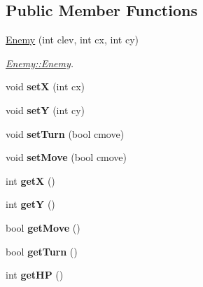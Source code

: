 \subsection*{Public Member Functions}
\begin{DoxyCompactItemize}
\item 
\hyperlink{class_enemy_a0638b6e9f11a72831051438dbf803d91}{Enemy} (int clev, int cx, int cy)
\begin{DoxyCompactList}\small\item\em \hyperlink{class_enemy_a0638b6e9f11a72831051438dbf803d91}{Enemy\-::\-Enemy}. \end{DoxyCompactList}\item 
\hypertarget{class_enemy_a0ebc35bd4cd41e81df912b6286426c46}{void {\bfseries set\-X} (int cx)}\label{class_enemy_a0ebc35bd4cd41e81df912b6286426c46}

\item 
\hypertarget{class_enemy_a1fab961fbc5b1fd1764515c1a00f424b}{void {\bfseries set\-Y} (int cy)}\label{class_enemy_a1fab961fbc5b1fd1764515c1a00f424b}

\item 
\hypertarget{class_enemy_aa07b45a0163d1c16326dc8706ec77414}{void {\bfseries set\-Turn} (bool cmove)}\label{class_enemy_aa07b45a0163d1c16326dc8706ec77414}

\item 
\hypertarget{class_enemy_a8742266192bffefd0746d5665e816463}{void {\bfseries set\-Move} (bool cmove)}\label{class_enemy_a8742266192bffefd0746d5665e816463}

\item 
\hypertarget{class_enemy_abdd71d2a54bf169ffb71801091704881}{int {\bfseries get\-X} ()}\label{class_enemy_abdd71d2a54bf169ffb71801091704881}

\item 
\hypertarget{class_enemy_a056667d7235d861cdc88ecfe2341ca90}{int {\bfseries get\-Y} ()}\label{class_enemy_a056667d7235d861cdc88ecfe2341ca90}

\item 
\hypertarget{class_enemy_a742cf2ff493fd15a4a11a13e20e60423}{bool {\bfseries get\-Move} ()}\label{class_enemy_a742cf2ff493fd15a4a11a13e20e60423}

\item 
\hypertarget{class_enemy_ad25491cf4bd75217a4d97318f0ec0677}{bool {\bfseries get\-Turn} ()}\label{class_enemy_ad25491cf4bd75217a4d97318f0ec0677}

\item 
\hypertarget{class_enemy_ab1c5ecbd2567b509a5d4492764a28f5d}{int {\bfseries get\-H\-P} ()}\label{class_enemy_ab1c5ecbd2567b509a5d4492764a28f5d}


\end{DoxyCompactItemize}

